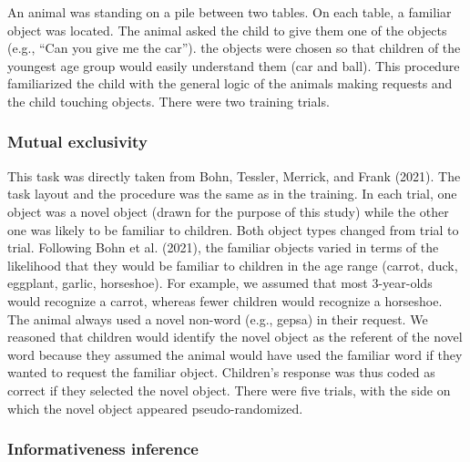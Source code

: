 \documentclass[
  english,
  man,floatsintext]{apa6}
\begin{document}
An animal was standing on a pile between two tables. On each table, a familiar object was located. The animal asked the child to give them one of the objects (e.g., ``Can you give me the car''). the objects were chosen so that children of the youngest age group would easily understand them (car and ball). This procedure familiarized the child with the general logic of the animals making requests and the child touching objects. There were two training trials.

\hypertarget{mutual-exclusivity}{%
\subsubsection{Mutual exclusivity}\label{mutual-exclusivity}}

This task was directly taken from Bohn, Tessler, Merrick, and Frank (2021). The task layout and the procedure was the same as in the training. In each trial, one object was a novel object (drawn for the purpose of this study) while the other one was likely to be familiar to children. Both object types changed from trial to trial. Following Bohn et al. (2021), the familiar objects varied in terms of the likelihood that they would be familiar to children in the age range (carrot, duck, eggplant, garlic, horseshoe). For example, we assumed that most 3-year-olds would recognize a carrot, whereas fewer children would recognize a horseshoe. The animal always used a novel non-word (e.g., gepsa) in their request. We reasoned that children would identify the novel object as the referent of the novel word because they assumed the animal would have used the familiar word if they wanted to request the familiar object. Children's response was thus coded as correct if they selected the novel object. There were five trials, with the side on which the novel object appeared pseudo-randomized.

\hypertarget{informativeness-inference}{%
\subsubsection{Informativeness inference}\label{informativeness-inference}}
\end{document}
